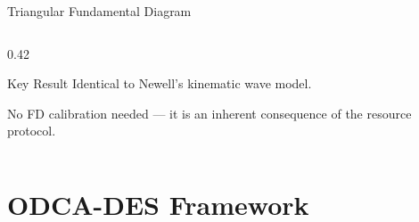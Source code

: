 \documentclass[11pt,aspectratio=169]{beamer}
\begin{document}
\begin{frame}[shrink=12]{Triangular Fundamental Diagram}
\begin{columns}[T]
\begin{column}{0.42\textwidth}
\vspace{0.8em}
\begin{block}{Key Result}
Identical to Newell's kinematic wave model.

\vspace{0.3em}
\alert{No FD calibration needed} --- it is an inherent consequence of the resource protocol.
\end{block}
\end{column}
\end{columns}
\end{frame}

\section{ODCA-DES Framework}
\end{document}
